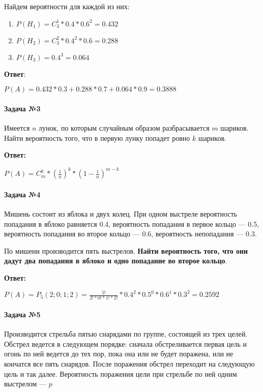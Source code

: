 \documentclass{article}
\begin{document}
Найдем вероятности для каждой из них:

\begin{enumerate}
    \item $P(H_{1}) = C_{3}^{1} * 0.4 * 0.6^{2} = 0.432$
    \item $P(H_{2}) = C_{3}^{2} * 0.4^{2} * 0.6 = 0.288$
    \item $P(H_{3}) = 0.4^3 = 0.064$
\end{enumerate}

\textbf{Ответ}:

$P(A) = 0.432 * 0.3 + 0.288 * 0.7 + 0.064 * 0.9 = 0.3888$

\paragraph{Задача №3}

Имеется $n$ лунок, по которым случайным образом разбрасывается $m$ шариков. Найти вероятность того, что в первую лунку попадет ровно $k$ шариков.

\textbf{Ответ:}

$P(A) = C_{m}^{k} * (\frac{1}{n})^{k} * (1 - \frac{1}{n})^{m - k}$

\paragraph{Задача №4}

Мишень состоит из яблока и двух колец. При одном выстреле вероятность попадания в яблоко равняется 0.4, вероятность попадания в первое кольцо — 0.5, вероятность попадания во второе кольцо — 0.6, вероятность непопадания — 0.3.

По мишени производится пять выстрелов. \textbf{Найти вероятность того, что они дадут два попадания в яблоко и одно попадание во второе кольцо}.

\textbf{Ответ:}

$P(A) = P_{5}(2;0;1;2) = \frac{5!}{2!*0!*1!*2!} * 0.4^2 * 0.5^0 * 0.6^1 * 0.3^2 = 0.2592$

\paragraph{Задача №5}

Производится стрельба пятью снарядами по группе, состоящей из трех целей. Обстрел ведется в следующем порядке: сначала обстреливается первая цель и огонь по ней ведется до тех пор, пока она или не будет поражена, или не кончатся все пять снарядов. После поражения обстрел переходит на следующую цель и так далее. Вероятность поражения цели при стрельбе по ней одним выстрелом — $p$
\end{document}
